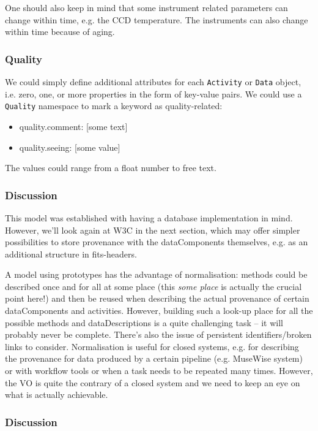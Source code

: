 \documentclass[11pt,a4paper]{ivoa}
\begin{document}
One should also keep in mind that some instrument related parameters can change within time,
e.g. the CCD temperature. The instruments can also change within time because of aging.


\subsubsection{Quality}
We could simply define additional attributes for each \texttt{Activity}
or \texttt{Data} object, i.e. zero, one, or more properties in the form of
key-value pairs. We could use a \texttt{Quality} namespace to mark a keyword
as quality-related:
\begin{itemize}
	\item quality.comment: [some text]
	\item quality.seeing: [some value]
\end{itemize}
The values could range from a float number to free text.

\subsubsection{Discussion}
This model was established with having a database implementation in mind. However, we'll look again at W3C in the next section, which may offer simpler possibilities to store provenance with the dataComponents themselves, e.g. as an additional structure in fits-headers.


A model using prototypes has the advantage of normalisation: methods could be described once and for all at some place (this \emph{some place} is actually the crucial point here!) and then be reused when describing the actual provenance of certain dataComponents and activities.
However, building such a look-up place for all the possible methods and dataDescriptions is a quite challenging task -- it will probably never be complete. There's also the issue of persistent identifiers/broken links to consider.
Normalisation is useful for closed systems, e.g. for describing the provenance for data produced by a certain pipeline (e.g. MuseWise system) or with workflow tools or when a task needs to be repeated many times. However, the VO is quite the contrary of a closed system and we need to keep an eye on what is actually achievable.






\subsubsection{Discussion}
\end{document}

